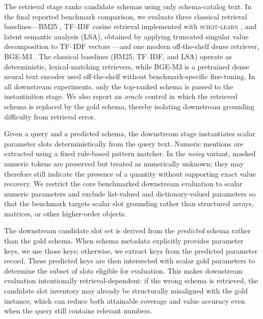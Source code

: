 \documentclass[pdflatex,sn-basic,Numbered]{sn-jnl}
\begin{document}
The retrieval stage ranks candidate schemas using only schema-catalog text. In the final reported benchmark comparison, we evaluate three classical retrieval baselines---BM25 \cite{robertson2009bm25}, TF--IDF cosine retrieval implemented with \textsc{scikit-learn} \cite{pedregosa2011sklearn}, and latent semantic analysis (LSA), obtained by applying truncated singular value decomposition to TF--IDF vectors \cite{deerwester1990lsa}---and one modern off-the-shelf dense retriever, BGE-M3 \cite{chen2024m3embedding}. The classical baselines (BM25, TF--IDF, and LSA) operate as deterministic, lexical-matching retrievers, while BGE-M3 is a pretrained dense neural text encoder used off-the-shelf without benchmark-specific fine-tuning. In all downstream experiments, only the top-ranked schema is passed to the instantiation stage. We also report an \emph{oracle} control in which the retrieved schema is replaced by the gold schema, thereby isolating downstream grounding difficulty from retrieval error.

Given a query and a predicted schema, the downstream stage instantiates scalar parameter slots deterministically from the query text. Numeric mentions are extracted using a fixed rule-based pattern matcher. In the \emph{noisy} variant, masked numeric tokens are preserved but treated as numerically unknown; they may therefore still indicate the presence of a quantity without supporting exact value recovery. We restrict the core benchmarked downstream evaluation to scalar numeric parameters and exclude list-valued and dictionary-valued parameters so that the benchmark targets scalar slot grounding rather than structured arrays, matrices, or other higher-order objects.

The downstream candidate slot set is derived from the \emph{predicted} schema rather than the gold schema. When schema metadata explicitly provides parameter keys, we use those keys; otherwise, we extract keys from the predicted parameter record. These predicted keys are then intersected with scalar gold parameters to determine the subset of slots eligible for evaluation. This makes downstream evaluation intentionally retrieval-dependent: if the wrong schema is retrieved, the candidate slot inventory may already be structurally misaligned with the gold instance, which can reduce both attainable coverage and value accuracy even when the query still contains relevant numbers.
\end{document}

